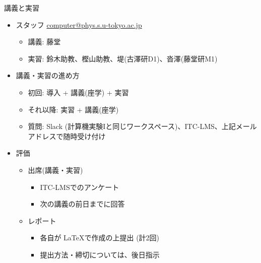 \begin{frame}[t,fragile]{講義と実習}
  \begin{itemize}
  \item スタッフ \href{mailto:computer@phys.s.u-tokyo.ac.jp}{computer@phys.s.u-tokyo.ac.jp}
    \begin{itemize}
    \item 講義: 藤堂
    \item 実習: 鈴木助教、樫山助教、堤(古澤研D1)、沓澤(藤堂研M1)
    \end{itemize}
  \item 講義・実習の進め方
    \begin{itemize}
    \item 初回: 導入 + 講義(座学) + 実習
    \item それ以降: 実習 + 講義(座学)
    \item 質問: Slack (計算機実験Iと同じワークスペース)、ITC-LMS、上記メールアドレスで随時受け付け
    \end{itemize}
  \item 評価
    \begin{itemize}
    \item 出席(講義・実習)
      \begin{itemize}
      \item ITC-LMSでのアンケート
      \item 次の講義の前日までに回答
      \end{itemize}    
    \item レポート
      \begin{itemize}
      \item 各自が \LaTeX で作成の上提出 (計2回)
      \item 提出方法・締切については、後日指示
      \end{itemize}
    \end{itemize}    
  \end{itemize}    
\end{frame}
